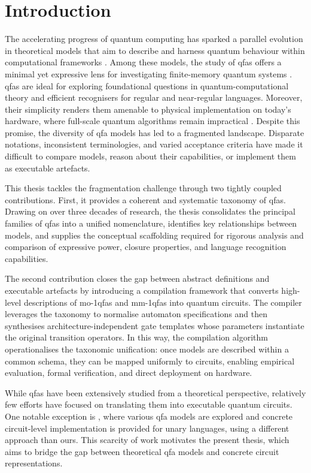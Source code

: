 \chapter{Introduction}
\label{chap:introduction}

The accelerating progress of quantum computing has sparked a parallel evolution in theoretical models that aim to describe and harness quantum behaviour within computational frameworks \cite{deutsch1985quantum}. Among these models, the study of \glspl{qfa} offers a minimal yet expressive lens for investigating finite-memory quantum systems \cite{ambainis19981,moore2000quantum}. \Glspl{qfa} are ideal for exploring foundational questions in quantum-computational theory and efficient recognisers for regular and near-regular languages. Moreover, their simplicity renders them amenable to physical implementation on today's hardware, where full-scale quantum algorithms remain impractical \cite{arute2019quantum}. Despite this promise, the diversity of \gls{qfa} models has led to a fragmented landscape. Disparate notations, inconsistent terminologies, and varied acceptance criteria have made it difficult to compare models, reason about their capabilities, or implement them as executable artefacts.

This thesis tackles the fragmentation challenge through two tightly coupled contributions. First, it provides a coherent and systematic taxonomy of \glspl{qfa}. Drawing on over three decades of research, the thesis consolidates the principal families of \glspl{qfa} into a unified nomenclature, identifies key relationships between models, and supplies the conceptual scaffolding required for rigorous analysis and comparison of expressive power, closure properties, and language recognition capabilities.

The second contribution closes the gap between abstract definitions and executable artefacts by introducing a compilation framework that converts high-level descriptions of \glspl{mo-1qfa} and \glspl{mm-1qfa} into quantum circuits. The compiler leverages the taxonomy to normalise automaton specifications and then synthesises architecture-independent gate templates whose parameters instantiate the original transition operators. In this way, the compilation algorithm operationalises the taxonomic unification: once models are described within a common schema, they can be mapped uniformly to circuits, enabling empirical evaluation, formal verification, and direct deployment on hardware.

While \glspl{qfa} have been extensively studied from a theoretical perspective, relatively few efforts have focused on translating them into executable quantum circuits. One notable exception is \cite{baik2024framework}, where various \gls{qfa} models are explored and concrete circuit-level implementation is provided for unary languages, using a different approach than ours. This scarcity of work motivates the present thesis, which aims to bridge the gap between theoretical \gls{qfa} models and concrete circuit representations.

